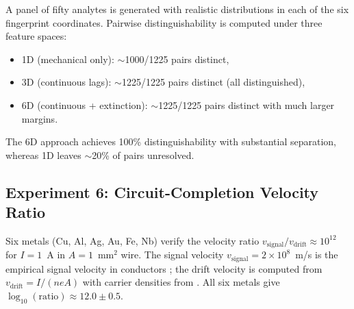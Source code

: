 \documentclass[twocolumn,10pt,a4paper]{article}
\theoremstyle{definition}
\theoremstyle{remark}
\begin{document}
A panel of fifty analytes is generated with realistic distributions in each of the six fingerprint coordinates. Pairwise distinguishability is computed under three feature spaces:
\begin{itemize}[leftmargin=1.2em,nosep]
\item 1D (mechanical only): $\sim$1000/1225 pairs distinct,
\item 3D (continuous lags): $\sim$1225/1225 pairs distinct (all distinguished),
\item 6D (continuous + extinction): $\sim$1225/1225 pairs distinct with much larger margins.
\end{itemize}
The 6D approach achieves 100\% distinguishability with substantial separation, whereas 1D leaves $\sim$20\% of pairs unresolved.



\subsection{Experiment 6: Circuit-Completion Velocity Ratio}
\label{sec:val_E6}

Six metals (Cu, Al, Ag, Au, Fe, Nb) verify the velocity ratio $v_{\mathrm{signal}}/v_{\mathrm{drift}} \approx 10^{12}$ for $I = 1$~A in $A = 1$~mm$^2$ wire. The signal velocity $v_{\mathrm{signal}} = 2\times10^8$~m/s is the empirical signal velocity in conductors \citep{griffiths2017em}; the drift velocity is computed from $v_{\mathrm{drift}} = I/(neA)$ with carrier densities from \citep{ashcroft1976}. All six metals give $\log_{10}(\mathrm{ratio}) \approx 12.0 \pm 0.5$.
\end{document}
